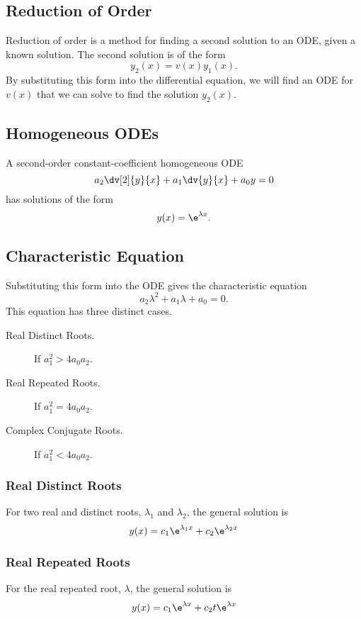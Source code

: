 \documentclass{article}
\begin{document}
\subsection{Reduction of Order}
Reduction of order is a method for finding a second solution 
to an ODE, given a known solution.
The second solution is of the form
\begin{equation*}
    y_2(x) = v(x) y_1(x).
\end{equation*} 
By substituting this form into the differential equation, we will find an ODE for
$v(x)$ that we can solve to find the solution $y_2(x)$.
\subsection{Homogeneous ODEs}
A second-order constant-coefficient homogeneous ODE 
\begin{equation*}
    a_2\dv[2]{y}{x} + a_1\dv{y}{x} + a_0y = 0
\end{equation*}
has solutions of the form
\begin{equation*}
    y(x) = \e^{\lambda x}.
\end{equation*}
\subsection{Characteristic Equation}
Substituting this form into the ODE gives the characteristic equation
\begin{equation*}
    a_2\lambda^2 + a_1\lambda + a_0 = 0.
\end{equation*}
This equation has three distinct cases.
\begin{description}
    \item[Real Distinct Roots.] If $a_1^2 > 4a_0a_2$.
    \item[Real Repeated Roots.] If $a_1^2 = 4a_0a_2$.
    \item[Complex Conjugate Roots.] If $a_1^2 < 4a_0a_2$.
\end{description}
\subsubsection{Real Distinct Roots}
For two real and distinct roots, $\lambda_1$ and $\lambda_2$, the general solution is
\begin{equation*}
    y(x) = c_1\e^{\lambda_1 x} + c_2\e^{\lambda_2 x} 
\end{equation*}
\subsubsection{Real Repeated Roots}
For the real repeated root, $\lambda$, the general solution is
\begin{equation*}
    y(x) = c_1\e^{\lambda x} + c_2 t\e^{\lambda x} 
\end{equation*}
\end{document}
